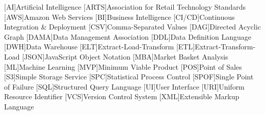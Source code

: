 
\singlespacing
\begin{acronym}[MMMMMM]
	[AI]{Artificial Intelligence}
	[ARTS]{Association for Retail Technology Standards}
	[AWS]{Amazon Web Services}
	[BI]{Business Intelligence}
	[CI/CD]{Continuous Integration \& Deployment}
	[CSV]{Comma-Separated Values}
	[DAG]{Directed Acyclic Graph}
	[DAMA]{Data Management Association}
	[DDL]{Data Definition Language}
	[DWH]{Data Warehouse}
	[ELT]{Extract-Load-Transform}
	[ETL]{Extract-Transform-Load}
	[JSON]{JavaScript Object Notation}
	[MBA]{Market Basket Analysis}
	[ML]{Machine Learning}
	[MVP]{Minimum Viable Product}
	[POS]{Point of Sales}
	[S3]{Simple Storage Service}
	[SPC]{Statistical Process Control}
	[SPOF]{Single Point of Failure}
	[SQL]{Structured Query Language}
	[UI]{User Interface}
	[URI]{Uniform Resource Identifier}
	[VCS]{Version Control System}
	[XML]{Extensible Markup Language}
\end{acronym}
\onehalfspacing